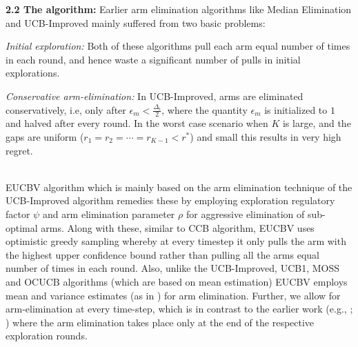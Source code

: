 \textbf{2.2 The algorithm:} Earlier arm elimination algorithms like Median Elimination \cite{even2006action} and UCB-Improved \cite{auer2010ucb} mainly suffered from two basic problems: \\
\begin{inparaenum}[\bfseries(i)]
\item \textit{Initial exploration:} Both of these algorithms pull each arm equal number of times in each round, and hence waste a significant number of pulls in initial explorations. \\
\item \textit{Conservative arm-elimination:} In UCB-Improved, arms are eliminated conservatively, i.e, only after $\epsilon_{m}<\frac{\Delta_{i}}{2}$, 
where the quantity $\epsilon_{m}$ is initialized to $1$ and halved after every round. In the worst case scenario when $K$ is large, and the gaps are uniform  ($r_{1}=r_{2}=\cdots=r_{K-1}<r^{*}$) and small this results in very high regret.\\
\end{inparaenum}
\\
	EUCBV algorithm which is mainly based on the arm elimination technique of the UCB-Improved algorithm remedies these by employing exploration regulatory factor $\psi$ and arm elimination parameter $\rho$ for aggressive elimination of sub-optimal arms. Along with these, similar to CCB \cite{liu2016modification} algorithm, EUCBV uses optimistic greedy sampling whereby at every timestep it only pulls the arm with the highest upper confidence bound rather than pulling all the arms equal number of times in each round. Also, unlike the UCB-Improved, UCB1, MOSS and OCUCB algorithms (which are based on mean estimation) EUCBV employs mean and variance estimates (as in \cite{audibert2009exploration}) for arm elimination. Further, we allow for arm-elimination at every time-step, which is in contrast to the earlier work (e.g., \cite{auer2010ucb}; \cite{even2006action}) where the arm elimination takes place only at the end of the respective exploration rounds. 




